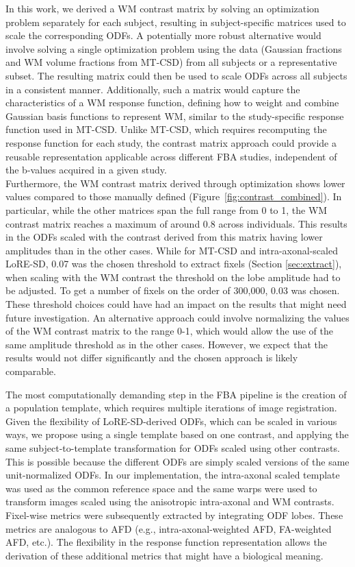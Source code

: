 In this work, we derived a WM contrast matrix by solving an optimization problem separately for each subject, resulting in subject-specific matrices used to scale the corresponding ODFs. A potentially more robust alternative would involve solving a single optimization problem using the data (Gaussian fractions and WM volume fractions from MT-CSD) from all subjects or a representative subset. The resulting matrix could then be used to scale ODFs across all subjects in a consistent manner.
Additionally, such a matrix would capture the characteristics of a WM response function, defining how to weight and combine Gaussian basis functions to represent WM, similar to the study-specific response function used in MT-CSD. Unlike MT-CSD, which requires recomputing the response function for each study, the contrast matrix approach could provide a reusable representation applicable across different FBA studies, independent of the b-values acquired in a given study.
\\Furthermore, the WM contrast matrix derived through optimization shows lower values compared to those manually defined (Figure~\ref{fig:contrast_combined}). In particular, while the other matrices span the full range from 0 to 1, the WM contrast matrix reaches a maximum of around 0.8 across individuals. This results in the ODFs scaled with the contrast derived from this matrix having lower amplitudes than in the other cases. While for MT-CSD and intra-axonal-scaled LoRE-SD, 0.07 was the chosen threshold to extract fixels (Section \ref{sec:extract}), when scaling with the WM contrast the threshold on the lobe amplitude had to be adjusted. To get a number of fixels on the order of 300,000, 0.03 was chosen.  These threshold choices could have had an impact on the results that might need future investigation. An alternative approach could involve normalizing the values of the WM contrast matrix to the range 0-1, which would allow the use of the same amplitude threshold as in the other cases. However, we expect that the results would not differ significantly and the chosen approach is likely comparable.


The most computationally demanding step in the FBA pipeline is the creation of a population template, which requires multiple iterations of image registration. Given the flexibility of LoRE-SD-derived ODFs, which can be scaled in various ways, we propose using a single template based on one contrast, and applying the same subject-to-template transformation for ODFs scaled using other contrasts. This is possible because the different ODFs are simply scaled versions of the same unit-normalized ODFs.
In our implementation, the intra-axonal scaled template was used as the common reference space and the same warps were used to transform images scaled using the anisotropic intra-axonal and WM contrasts.
Fixel-wise metrics were subsequently extracted by integrating ODF lobes. These metrics are analogous to AFD (e.g., intra-axonal-weighted AFD, FA-weighted AFD, etc.). The flexibility in the response function representation allows the derivation of these additional metrics that might have a biological meaning.

